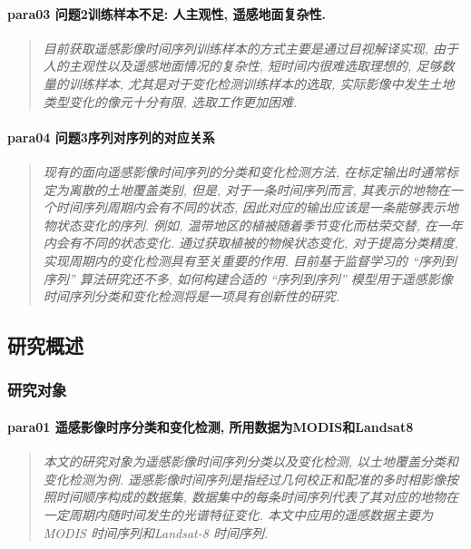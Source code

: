 \paragraph*{para03
    \textcolor[RGB]{17, 205, 29}{问题2训练样本不足: 人主观性, 遥感地面复杂性.}}
\begin{quotation}
    \itshape
    目前获取遥感影像时间序列训练样本的方式主要是通过目视解译实现, 由于人的主观性以及遥感地面情况的复杂性, 短时间内很难选取理想的, 足够数量的训练样本, 尤其是对于变化检测训练样本的选取, 实际影像中发生土地类型变化的像元十分有限, 选取工作更加困难. 
\end{quotation}

\paragraph*{para04
    \textcolor[RGB]{17, 205, 29}{问题3序列对序列的对应关系}}
\begin{quotation}
    \itshape
    现有的面向遥感影像时间序列的分类和变化检测方法, 在标定输出时通常标定为离散的土地覆盖类别, 但是, 对于一条时间序列而言, 其表示的地物在一个时间序列周期内会有不同的状态, 因此对应的输出应该是一条能够表示地物状态变化的序列. 例如, 温带地区的植被随着季节变化而枯荣交替, 在一年内会有不同的状态变化. 通过获取植被的物候状态变化, 对于提高分类精度, 实现周期内的变化检测具有至关重要的作用. 目前基于监督学习的 ``序列到序列'' 算法研究还不多, 如何构建合适的 ``序列到序列'' 模型用于遥感影像时间序列分类和变化检测将是一项具有创新性的研究. 
\end{quotation}

\subsection{研究概述}

\subsubsection{研究对象}
\paragraph*{para01
    \textcolor[RGB]{17, 205, 29}{遥感影像时序分类和变化检测, 所用数据为MODIS和Landsat8}}
\begin{quotation}
    \itshape
    本文的研究对象为遥感影像时间序列分类以及变化检测, 以土地覆盖分类和变化检测为例. 遥感影像时间序列是指经过几何校正和配准的多时相影像按照时间顺序构成的数据集, 数据集中的每条时间序列代表了其对应的地物在一定周期内随时间发生的光谱特征变化. 本文中应用的遥感数据主要为 MODIS 时间序列和Landsat-8 时间序列. 
\end{quotation}

